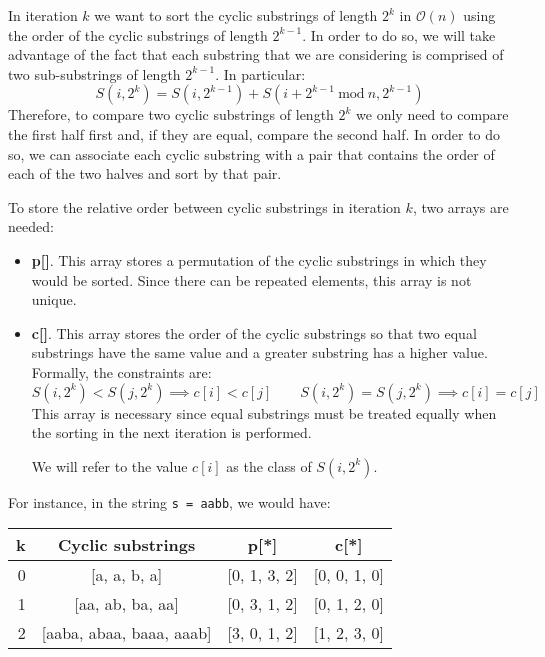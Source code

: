 In iteration $k$ we want to sort the cyclic substrings of
length $2^k$ in $\mathcal{O}(n)$ using the order of 
the cyclic substrings of length $2^{k-1}$. In order to do so,
we will take advantage of the fact that each substring that 
we are considering is comprised of two sub-substrings of
length $2^{k-1}$. In particular: 
\[S(i,2^{k}) = S(i,2^{k-1}) + S(i+2^{k-1} \ \mathrm{mod} \ n,2^{k-1})\]
Therefore, to compare two cyclic substrings of length $2^k$ we only need
to compare the first half first and, if they are equal, compare the second
half. In order to do so, we can associate each cyclic substring with
a pair that contains the order of each of the two halves and sort by that
pair.

To store the relative order between cyclic substrings in iteration $k$, 
two arrays are needed:
\begin{itemize}
		\item \textbf{p[]}. This array stores a permutation of the cyclic
				substrings in which they would be sorted. Since there can be
				repeated elements, this array is not unique.

		\item \textbf{c[]}. This array stores the order of the cyclic 
				substrings so that two equal substrings have the same value 
				and a greater substring  has a higher value. Formally, the
				constraints are:
				\[
						S(i,2^k) < S(j,2^k) \implies c[i] < c[j] \qquad
						S(i,2^k) = S(j,2^k) \implies c[i] = c[j]
				\]
				This array is necessary since equal substrings must be 
				treated equally when the sorting in the next iteration 
				is performed.

				We will refer to the value $c[i]$ as the class of $S(i,2^k)$.
\end{itemize}
For instance, in the string \texttt{s = aabb}, we would have:
\begin{table}[h!]
		\centering
		\ttfamily
				\def \arraystretch{1.2}
		\begin{tabular}{rccc}
				k & Cyclic substrings & p[*] & c[*] \\
				\hline
				0 & [a, a, b, a] & [0, 1, 3, 2] & [0, 0, 1, 0] \\
				1 & [aa, ab, ba, aa] & [0, 3, 1, 2] & [0, 1, 2, 0] \\
				2 & [aaba, abaa, baaa, aaab] & [3, 0, 1, 2] & [1, 2, 3, 0] \\
		
		\end{tabular}
\end{table}

